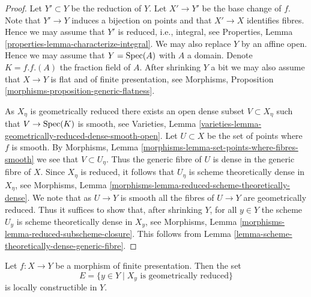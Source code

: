 \begin{proof}
Let $Y' \subset Y$ be the reduction of $Y$. Let $X' \to Y'$
be the base change of $f$. Note that $Y' \to Y$
induces a bijection on points and that $X' \to X$ identifies fibres.
Hence we may assume that $Y'$ is reduced, i.e., integral, see
Properties, Lemma \ref{properties-lemma-characterize-integral}.
We may also replace $Y$ by an affine open. Hence we may assume that
$Y = \mathop{\rm Spec}(A)$ with $A$ a domain. Denote $K = f.f.(A)$ the
fraction field of $A$. After shrinking $Y$ a bit we may also assume that
$X \to Y$ is flat and of finite presentation, see
Morphisms, Proposition \ref{morphisms-proposition-generic-flatness}.

\medskip\noindent
As $X_\eta$ is geometrically reduced there exists an open dense
subset $V \subset X_\eta$ such that $V \to \mathop{\rm Spec}(K)$ is smooth, see
Varieties, Lemma \ref{varieties-lemma-geometrically-reduced-dense-smooth-open}.
Let $U \subset X$ be the set of points where $f$ is smooth. By
Morphisms, Lemma \ref{morphisms-lemma-set-points-where-fibres-smooth}
we see that $V \subset U_\eta$. Thus the generic fibre of $U$ is dense
in the generic fibre of $X$. Since $X_\eta$ is reduced, it follows
that $U_\eta$ is scheme theoretically dense in $X_\eta$, see
Morphisms, Lemma \ref{morphisms-lemma-reduced-scheme-theoretically-dense}.
We note that as $U \to Y$ is smooth all the fibres of $U \to Y$
are geometrically reduced. Thus it suffices to show that, after
shrinking $Y$, for all $y \in Y$ the scheme $U_y$ is scheme theoretically
dense in $X_y$, see
Morphisms, Lemma \ref{morphisms-lemma-reduced-subscheme-closure}.
This follows from
Lemma \ref{lemma-scheme-theoretically-dense-generic-fibre}.
\end{proof}

\begin{lemma}
\label{lemma-geometrically-reduced-constructible}
Let $f : X \to Y$ be a morphism of finite presentation.
Then the set
$$
E = \{y \in Y \mid X_y\text{ is geometrically reduced}\}
$$
is locally constructible in $Y$.
\end{lemma}

